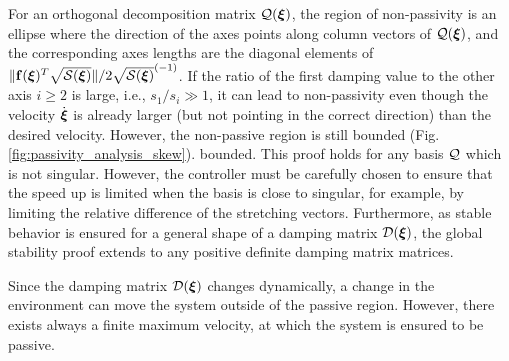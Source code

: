 For an orthogonal decomposition matrix $\mathcal{Q}(\boldsymbol{{\boldsymbol{\xi}}})$, the region of non-passivity is an ellipse where the direction of the axes points along column vectors of $\mathcal{Q}({\boldsymbol{\xi}})$, and the corresponding axes lengths are the diagonal elements of $\| \mathbf{f}({\boldsymbol{\xi}})^T \sqrt{\mathcal{S}({\boldsymbol{\xi}})}\| / 2 \sqrt{\mathcal{S}({\boldsymbol{\xi}})}^{(-1)}$. 
If the ratio of the first damping value to the other axis $i \geq 2$ is large, i.e., $s_1 / s_i \gg 1$, it can lead to non-passivity even though the velocity $\dot{\boldsymbol{\xi}}$ is already larger (but not pointing in the correct direction) than the desired velocity. However, the non-passive region is still \iflong bounded (Fig.\ref{fig:passivity_analysis_skew}). \else bounded. \fi
This proof holds for any basis $\mathcal{Q}$ which is not singular. However, the controller must be carefully chosen to ensure that the speed up is limited when the basis is close to singular, for example, by limiting the relative difference of the stretching vectors. Furthermore, as stable behavior is ensured for a general shape of a damping matrix $\mathcal{D}(\boldsymbol{\xi})$, the global stability proof extends to any positive definite damping matrix matrices.

Since the damping matrix $\mathcal{D}(\boldsymbol{\xi})$ changes dynamically, a change in the environment can move the system outside of the passive region. However, there exists always a finite maximum velocity, at which the system is ensured to be passive.

